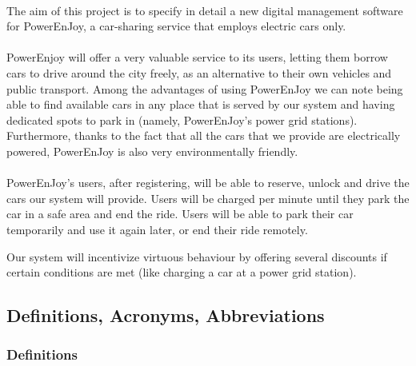 \documentclass[english]{article}
\begin{document}
\paragraph{}
The aim of this project is to specify in detail a new digital management software for PowerEnJoy, a car-sharing service that employs electric cars only.

\paragraph{}
PowerEnjoy will offer a very valuable service to its users, letting them borrow cars to drive around the city freely, as an alternative to their own vehicles and public transport.
Among the advantages of using PowerEnJoy we can note being able to find available cars in any place that is served by our system and having dedicated spots to park in (namely, PowerEnJoy's power grid stations). 
Furthermore, thanks to the fact that all the cars that we provide are electrically powered, PowerEnJoy is also very environmentally friendly.

\paragraph{}
PowerEnJoy's users, after registering, will be able to reserve, unlock and drive the cars our system will provide. Users will be charged per minute until they park the car in a safe area and end the ride.
Users will be able to park their car temporarily and use it again later, or end their ride remotely.

Our system will incentivize virtuous behaviour by offering several discounts if certain conditions are met (like charging a car at a power grid station).


\newpage
\subsection{Definitions, Acronyms, Abbreviations}


\subsubsection{Definitions}
\end{document}
